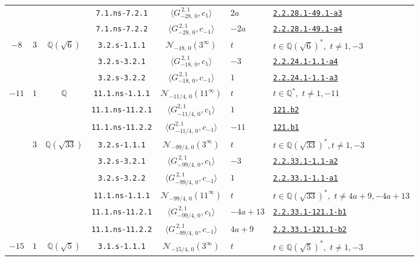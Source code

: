 \documentclass[11pt]{amsart}
\newcommand{\eclabel}[1]{\href{https://www.lmfdb.org/EllipticCurve/Q/#1}{\texttt{#1}}}
\newcommand{\ecnflabel}[2]{\href{https://www.lmfdb.org/EllipticCurve/#1-#2}{\texttt{#1-#2}}}
\theoremstyle{definition}
\newcommand{\Q}{\mathbb Q}
\newcommand{\QQ}{\mathbb Q}
\begin{document}
{\begin{longtable}{|c|c|c|c|c|l|l|}
&  & & \texttt{7.1.ns-7.2.1} & $\langle G^{\,2,1}_{-28,\,0},c_{1}\rangle$ &   $2a$ &  \ecnflabel{2.2.28.1}{49.1-a3} \\ \cline{4-7} 
&  & & \texttt{7.1.ns-7.2.2} & $\langle G^{\,2,1}_{-28,\,0},c_{-1}\rangle$ &   $-2a$ & \ecnflabel{2.2.28.1}{49.1-a4} \\ \hline
{$-8$} &  {$3$} &  {$\Q(\sqrt{6})$} 
 & \texttt{3.2.s-1.1.1} & $\mathcal{N}_{-18,\,0}(3^{\infty})$ &   $t$ &  $t\in \Q(\sqrt{6})^*,\,\,t\ne 1, -3 $ \\ \cline{4-7} 
&  & & \texttt{3.2.s-3.2.1} & $\langle G^{\,2,1}_{-18,\,0},c_{1}\rangle$ &   $-3$ &  \ecnflabel{2.2.24.1}{1.1-a4} \\ \cline{4-7} 
& &  & \texttt{3.2.s-3.2.2} & $\langle G^{\,2,1}_{-18,\,0},c_{-1}\rangle$ &   $1$ &  \ecnflabel{2.2.24.1}{1.1-a3} \\ \hline
{$-11$} & {$1$}  & {$\QQ$}   
& \texttt{11.1.ns-1.1.1} & $\mathcal{N}_{-11/4,\,0}(11^{\infty})$  &   $t$ &  $t\in \Q^*,\,\,t\ne 1,-11 $ \\ \cline{4-7} 
 & &  & \texttt{11.1.ns-11.2.1} & $\langle G^{2,1}_{-11/4,\,0},c_{1}\rangle$ &   $1$ &  \eclabel{121.b2} \\ \cline{4-7} 
 & &  & \texttt{11.1.ns-11.2.2} & $\langle G^{2,1}_{-11/4,\,0},c_{-1}\rangle$ &   $-11$ & \eclabel{121.b1} \\ \cline{2-7}
 & {$3$} &  {$\Q(\sqrt{33})$} 
 & \texttt{3.2.s-1.1.1} & $\mathcal{N}_{-99/4,\,0}(3^{\infty})$ &   $t$ &  $t\in \Q(\sqrt{33})^*, t \neq 1, -3$ \\ \cline{4-7} 
& &  & \texttt{3.2.s-3.2.1} & $\langle G^{\,2,1}_{-99/4,\,0},c_{1}\rangle$ &   $-3$ &   \ecnflabel{2.2.33.1}{1.1-a2} \\ \cline{4-7} 
& &  & \texttt{3.2.s-3.2.2} & $\langle G^{\, 2,1}_{-99/4,\,0},c_{-1}\rangle$ &   $1$ &  \ecnflabel{2.2.33.1}{1.1-a1} \\ \cline{4-7} 
& &  & \texttt{11.1.ns-1.1.1} & $\mathcal{N}_{-99/4,\,0}(11^{\infty})$ &   $t$ &  $t\in \Q(\sqrt{33})^*,\,\,t\ne 4a+9, -4a+13 $ \\ \cline{4-7} 
& &  & \texttt{11.1.ns-11.2.1} & $\langle G^{\,2,1}_{-99/4,\,0},c_{1}\rangle$ &   $-4a+13$ & \ecnflabel{2.2.33.1}{121.1-b1}  \\ \cline{4-7} 
& &  & \texttt{11.1.ns-11.2.2} & $\langle G^{\, 2,1}_{-99/4,\,0},c_{-1}\rangle$ &   $4a+9$ &  \ecnflabel{2.2.33.1}{121.1-b2} \\ \hline
{$-15$} & {$1$} &  {$\Q(\sqrt{5})$} 
 & \texttt{3.1.s-1.1.1} & $\mathcal{N}_{-15/4,\,0}(3^{\infty})$ &   $t$ &  $t\in \Q(\sqrt{5})^*,\,\,t\ne 1,-3 $ \\ \cline{4-7} 

\end{longtable}}
\end{document}
